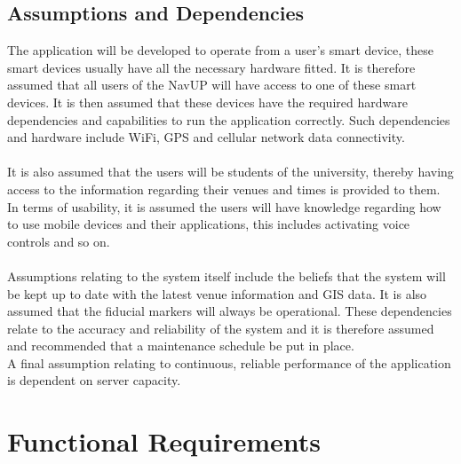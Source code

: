 \documentclass{article}
\begin{document}
	
	\subsection{Assumptions and Dependencies}
		The application will be developed to operate from a user's smart device, these smart devices usually have all the necessary hardware fitted. It is therefore assumed that all users of the NavUP will have access to one of these smart devices. It is then assumed that these devices have the required hardware dependencies and capabilities to run the application correctly. Such dependencies and hardware include WiFi, GPS and cellular network data connectivity.\\ \\
		It is also assumed that the users will be students of the university, thereby having access to the information regarding their venues and times is provided to them.\\
		In terms of usability, it is assumed the users will have knowledge regarding how to use mobile devices and their applications, this includes activating voice controls and so on. \\ \\
		Assumptions relating to the system itself include the beliefs that the system will be kept up to date with the latest venue information and GIS data. It is also assumed that the fiducial markers will always be operational. These dependencies relate to the accuracy and reliability of the system and it is therefore assumed and recommended that a maintenance schedule be put in place.\\
		A final assumption relating to continuous, reliable performance of the application is dependent on server capacity.
		
		
		

\newpage
\section{Functional Requirements}
\end{document}
